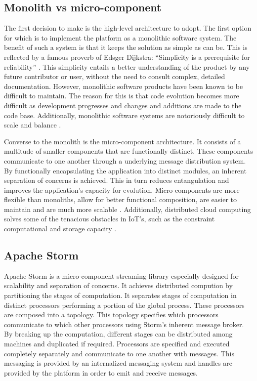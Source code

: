 \subsection{Monolith vs micro-component}
The first decision to make is the high-level architecture to adopt. The first option for which is to implement the platform as a monolithic software system. The benefit of such a system is that it keeps the solution as simple as can be. This is reflected by a famous proverb of Edsger Dijkstra: ``Simplicity is a prerequisite for reliability'' \cite{dijkstra}. This simplicity entails a better understanding of the product by any future contributor or user, without the need to consult complex, detailed documentation. However, monolithic software products have been known to be difficult to maintain. The reason for this is that code evolution becomes more difficult as development progresses and changes and additions are made to the code base. Additionally, monolithic software systems are notoriously difficult to scale and balance \cite{mono_vs_micro}.

Converse to the monolith is the micro-component architecture. It consists of a multitude of smaller components that are functionally distinct. These components communicate to one another through a underlying message distribution system. By functionally encapsulating the application into distinct modules, an inherent separation of concerns is achieved. This in turn reduces entangulation and improves the application's capacity for evolution. Micro-components are more flexible than monoliths, allow for better functional composition, are easier to maintain and are much more scalable \cite{mono_vs_micro}. Additionally, distributed cloud computing solves some of the tenacious obstacles in IoT's, such as the constraint computational and storage capacity \cite{benefits_cloud_to_iot}. 

\subsection{Apache Storm}
Apache Storm is a micro-component streaming library especially designed for scalability and separation of concerns. It achieves distributed compution by partitioning the stages of computation. It separates stages of computation in distinct processors performing a portion of the global process. These processors are composed into a topology. This topology specifies which processors communicate to which other processors using Storm's inherent message broker. By breaking up the computation, different stages can be distributed among machines and duplicated if required. Processors are specified and executed completely separately and communicate to one another with messages. This messaging is provided by an internalized messaging system and handles are provided by the platform in order to emit and receive messages.

